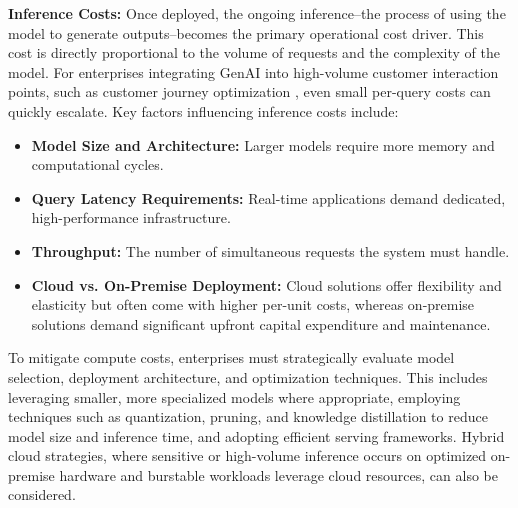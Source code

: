\documentclass[10pt,twocolumn,letterpaper]{article}
\begin{document}
\textbf{Inference Costs:} Once deployed, the ongoing inference--the process of using the model to generate outputs--becomes the primary operational cost driver. This cost is directly proportional to the volume of requests and the complexity of the model. For enterprises integrating GenAI into high-volume customer interaction points, such as customer journey optimization \cite{openalex_w4400993506}, even small per-query costs can quickly escalate. Key factors influencing inference costs include:
\begin{itemize}
  \item \textbf{Model Size and Architecture:} Larger models require more memory and computational cycles.
  \item \textbf{Query Latency Requirements:} Real-time applications demand dedicated, high-performance infrastructure.
  \item \textbf{Throughput:} The number of simultaneous requests the system must handle.
  \item \textbf{Cloud vs. On-Premise Deployment:} Cloud solutions offer flexibility and elasticity but often come with higher per-unit costs, whereas on-premise solutions demand significant upfront capital expenditure and maintenance.
\end{itemize}

To mitigate compute costs, enterprises must strategically evaluate model selection, deployment architecture, and optimization techniques. This includes leveraging smaller, more specialized models where appropriate, employing techniques such as quantization, pruning, and knowledge distillation to reduce model size and inference time, and adopting efficient serving frameworks. Hybrid cloud strategies, where sensitive or high-volume inference occurs on optimized on-premise hardware and burstable workloads leverage cloud resources, can also be considered.
\end{document}
